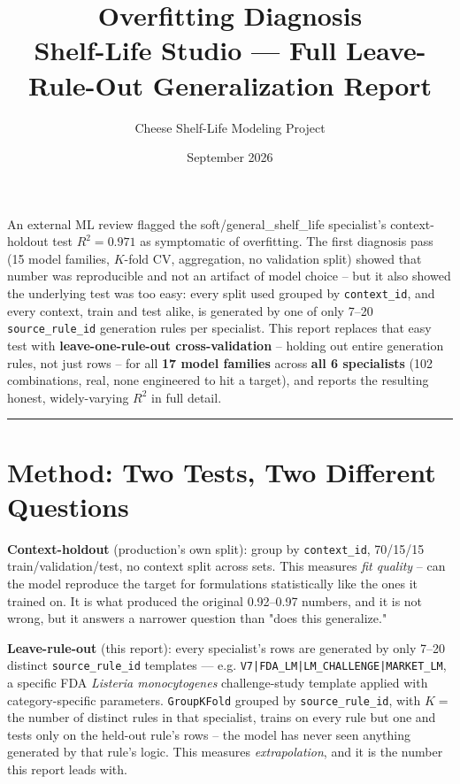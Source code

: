 \documentclass[11pt]{article}
\title{\vspace{-1.5em}\textcolor{burgundy}{\Huge\bfseries Overfitting Diagnosis}\\[0.3em]
\Large\color{ink} Shelf-Life Studio --- Full Leave-Rule-Out Generalization Report}
\author{Cheese Shelf-Life Modeling Project}
\date{September 2026}
\begin{document}
\maketitle
\vspace{-2em}

\begin{center}
\begin{minipage}{0.92\linewidth}
\small\color{muted}\centering
An external ML review flagged the soft/general\_shelf\_life specialist's
context-holdout test $R^2{=}0.971$ as symptomatic of overfitting. The
first diagnosis pass (15 model families, $K$-fold CV, aggregation, no
validation split) showed that number was reproducible and not an artifact
of model choice -- but it also showed the underlying test was too easy:
every split used grouped by \texttt{context\_id}, and every context, train
and test alike, is generated by one of only 7--20 \texttt{source\_rule\_id}
generation rules per specialist. This report replaces that easy test with
\textbf{leave-one-rule-out cross-validation} -- holding out entire
generation rules, not just rows -- for all \textbf{17 model families} across
\textbf{all 6 specialists} (102 combinations, real, none engineered to hit
a target), and reports the resulting honest, widely-varying $R^2$ in full
detail.
\end{minipage}
\end{center}

\vspace{0.6em}
\hrule
\vspace{0.8em}

\section{Method: Two Tests, Two Different Questions}
\textbf{Context-holdout} (production's own split): group by
\texttt{context\_id}, 70/15/15 train/validation/test, no context split
across sets. This measures \emph{fit quality} -- can the model reproduce
the target for formulations statistically like the ones it trained on. It
is what produced the original 0.92--0.97 numbers, and it is not wrong, but
it answers a narrower question than "does this generalize."

\textbf{Leave-rule-out} (this report): every specialist's rows are
generated by only 7--20 distinct \texttt{source\_rule\_id} templates ---
e.g. \texttt{V7|FDA\_LM|LM\_CHALLENGE|MARKET\_LM}, a specific FDA
\emph{Listeria monocytogenes} challenge-study template applied with
category-specific parameters. \texttt{GroupKFold} grouped by
\texttt{source\_rule\_id}, with $K{=}$ the number of distinct rules in that
specialist, trains on every rule but one and tests only on the held-out
rule's rows -- the model has never seen anything generated by that rule's
logic. This measures \emph{extrapolation}, and it is the number this
report leads with.
\end{document}

